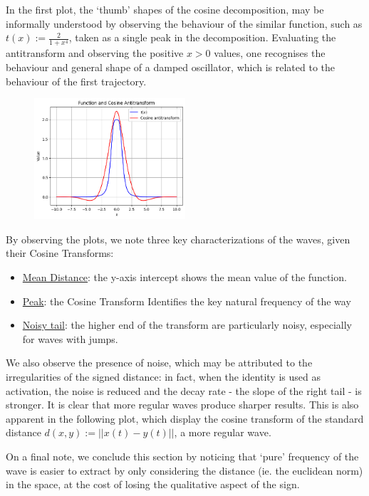 \documentclass[11pt, twocolumn]{article}
\begin{document}
        In the first plot, the `thumb' shapes of the cosine decomposition, may be informally understood by observing the behaviour of the similar function, such as $t(x) := \frac{2}{1+x^4}$, taken as a single peak in the decomposition. Evaluating the antitransform and observing the positive $x>0$ values, one recognises the behaviour and general shape of a damped oscillator, which is related to the behaviour of the first trajectory.

        \begin{figure}[H]
          \centering
          \includegraphics[width=0.5\textwidth]{figures/f_and_cos_antitr.png}
          \label{fig:antitransform}
        \end{figure}

        By observing the plots, we note three key characterizations of the waves, given their Cosine Transforms:
        \begin{itemize}
          \item \underline{Mean Distance}: the y-axis intercept shows the mean value of the function.
          \item \underline{Peak}: the Cosine Transform Identifies the key natural frequency of the way
          \item \underline{Noisy tail}: the higher end of the transform are particularly noisy, especially for waves with jumps.
        \end{itemize}

        We also observe the presence of noise, which may be attributed to the irregularities of the signed distance: in fact, when the identity is used as activation, the noise is reduced and the decay rate - the slope of the right tail - is stronger. It is clear that more regular waves produce sharper results. This is also apparent in the following plot, which display the cosine transform of the standard distance $d(x,y) := ||x(t)-y(t)||$, a more regular wave.

        On a final note, we conclude this section by noticing that `pure' frequency of the wave is easier to extract by only considering the distance (ie. the euclidean norm) in the space, at the cost of losing the qualitative aspect of the sign.
\end{document}
